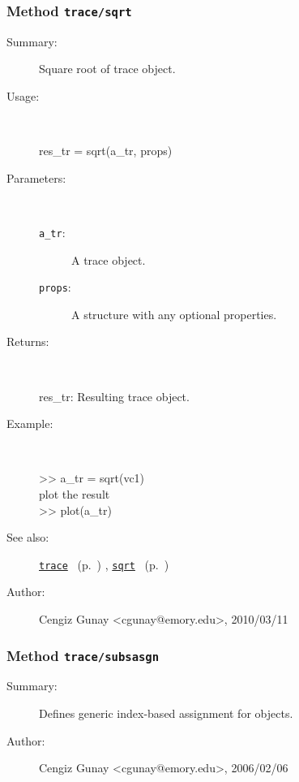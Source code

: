 \subsubsection[Method \texttt{sqrt}]{Method \texttt{trace/sqrt}}%
%
\label{ref_trace__sqrt}%
\hypertarget{ref_trace__sqrt}{}%
\begin{description}
\item[Summary:]Square root of trace object.
%
\item[Usage:]~%
\begin{lyxcode}%
res\_tr = sqrt(a\_tr, props)
%
\end{lyxcode}%
%
%
\item[Parameters:]~
\begin{description}%
\item[\texttt{a\_tr}:]
 A trace object.
\item[\texttt{props}:]
 A structure with any optional properties.
\end{description}%
%
\item[Returns:
]~

   res\_tr: Resulting trace object.
%
\item[Example:]~
\begin{lyxcode} >> a\_tr = sqrt(vc1)
\\%
 plot the result
\\%
 >> plot(a\_tr)
\\%
\end{lyxcode}
%
\item[See also:]%
\hyperlink{ref_trace}{\texttt{trace}}%
\ (p.~\pageref{ref_trace})%
%
, \hyperlink{ref_sqrt}{\texttt{sqrt}}%
\ (p.~\pageref{ref_sqrt})%
%
%
\item[Author:]%
Cengiz Gunay <cgunay@emory.edu>, 2010/03/11
%
\end{description}
\methodline%
\subsubsection[Method \texttt{subsasgn}]{Method \texttt{trace/subsasgn}}%
%
\label{ref_trace__subsasgn}%
\hypertarget{ref_trace__subsasgn}{}%
\begin{description}
\item[Summary:]Defines generic index-based assignment for objects.
%
%
%
%
%
%
%
\item[Author:]%
Cengiz Gunay <cgunay@emory.edu>, 2006/02/06
%
\end{description}
\methodline%
